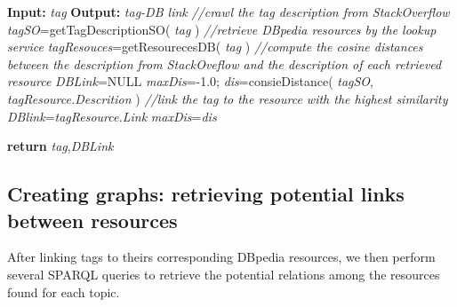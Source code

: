 \begin{algorithm}%
\begin{algorithmic}[1]
\label{algo:chp6link}
\State \textbf{Input:} \textit{ tag}
\State \textbf{Output:} \textit{tag-DB link}
\State \textit{//crawl the tag description from StackOverflow}
\State \textit{tagSO}=getTagDescriptionSO( \textit{tag} )
\State \textit{//retrieve DBpedia resources by the lookup service}
\State \textit{tagResouces}=getResourecesDB( \textit{tag} )
\State \textit{//compute the cosine distances between the description from StackOveflow and the description of each retrieved resource}
\State \textit{DBLink}=NULL
\State \textit{maxDis}=-1.0;
\State \textit{dis}=consieDistance( \textit{tagSO}, \textit{tagResource.Descrition} )
\State \textit{//link the tag to the resource with the highest similarity}
\State \textit{DBlink}=\textit{tagResource.Link}
\State \textit{maxDis}=\textit{dis}
\EndIf

\EndFor
\State \textbf{return} \textit{tag},\textit{DBLink}

\end{algorithmic}
\end{algorithm}












\subsection{Creating graphs: retrieving potential links between resources}
After linking tags to theirs corresponding DBpedia resources, we then perform several SPARQL queries to retrieve the potential relations among the resources found for each topic. 



